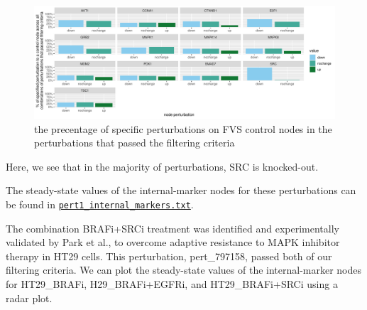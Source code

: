 \documentclass[
]{book}
\begin{document}
\begin{figure}

{\centering \includegraphics{_main_files/figure-latex/unnamed-chunk-41-1} 

}

\caption{the precentage of specific perturbations on FVS control nodes in the perturbations that passed the filtering criteria}\label{fig:unnamed-chunk-41}
\end{figure}

Here, we see that in the majority of perturbations, SRC is knocked-out.

The steady-state values of the internal-marker nodes for these perturbations can be found in \href{https://github.com/VeraLiconaResearchGroup/Netisce/blob/main/colorectal_cancer_validation/results/3-marker-nodes/pert_internal_markers.txt}{\texttt{pert1\_internal\_markers.txt}}.

The combination BRAFi+SRCi treatment was identified and experimentally validated by Park et al., to overcome adaptive resistance to MAPK inhibitor therapy in HT29 cells. This perturbation, pert\_797158, passed both of our filtering criteria. We can plot the steady-state values of the internal-marker nodes for HT29\_BRAFi, H29\_BRAFi+EGFRi, and HT29\_BRAFi+SRCi using a radar plot.
\end{document}
